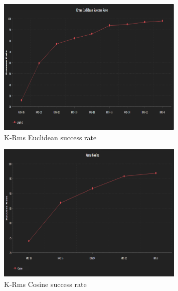 \documentclass{article}
\begin{document}
{                    \begin{figure}[h]
                        \centering
                        \includegraphics[width=0.8\textwidth]{Figures/krmsEuclSuc.PNG}
                        \caption{K-Rms Euclidean success rate}
                        \label{fig:my_label}
                    \end{figure}
                    
                    \begin{figure}[h]
                        \centering
                        \includegraphics[width=0.8\textwidth]{Figures/krmsCosSuc.PNG}
                        \caption{K-Rms Cosine success rate}
                        \label{fig:my_label}
                    \end{figure}
                    
}
\end{document}
